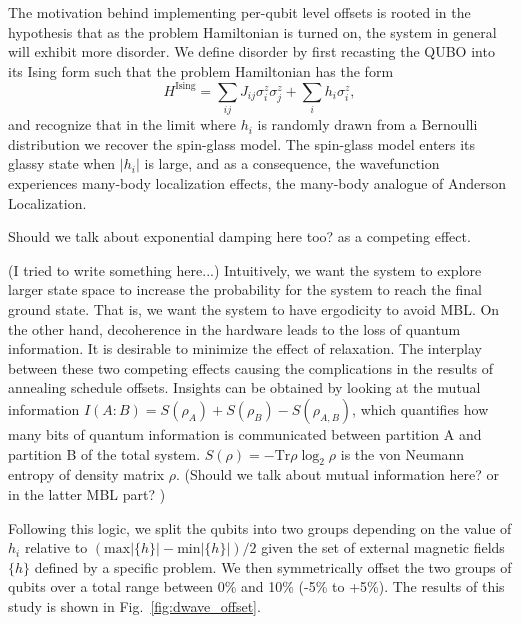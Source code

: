 \documentclass[prd,twocolumn,tightenlines,preprintnumbers,showpacs,superscriptaddress,notitlepage,nofootinbib,eqsecnum,floatfix,longbibliography]{revtex4}
\begin{document}
The motivation behind implementing per-qubit level offsets is rooted in the hypothesis that as the problem Hamiltonian is turned on, the system in general will exhibit more disorder. We define disorder by first recasting the QUBO into its Ising form such that the problem Hamiltonian has the form
\begin{equation}
H^{\textrm{Ising}} = \sum_{ij} J_{ij} \sigma^z_i \sigma^z_j + \sum_i h_i \sigma^z_i,
\end{equation}
and recognize that in the limit where $h_i$ is randomly drawn from a Bernoulli distribution we recover the spin-glass model. The spin-glass model enters its glassy state when $|h_i|$ is large, and as a consequence, the wavefunction experiences many-body localization effects, the many-body analogue of Anderson Localization. 

{\color{red} Should we talk about exponential damping here too? as a competing effect.}

{\color{blue} (I tried to write something here...) Intuitively, we want the system to explore larger state space to increase the probability for the system to reach the final ground state. That is, we want the system to have ergodicity to avoid MBL. On the other hand, decoherence in the hardware leads to the loss of quantum information. It is desirable to minimize the effect of relaxation. The interplay between these two competing effects causing the complications in the results of annealing schedule offsets. Insights can be obtained by looking at the mutual information $I(A:B)=S(\rho_A)+S(\rho_B)-S(\rho_{A,B})$, which quantifies how many bits of quantum information is communicated between partition A and partition B of the total system. $S(\rho)=-\mbox{Tr}\rho \log_2 \rho$ is the von Neumann entropy of density matrix $\rho$.
(Should we talk about mutual information here? or in the latter MBL part? )}



Following this logic, we split the qubits into two groups depending on the value of $h_i$ relative to $(\textrm{max}|\{h\}| - \textrm{min}|\{h\}|) / 2$ given the set of external magnetic fields $\{h\}$ defined by a specific problem. We then symmetrically offset the two groups of qubits over a total range between 0\% and 10\% (-5\% to +5\%). The results of this study is shown in Fig.~\ref{fig:dwave_offset}.
\end{document}
